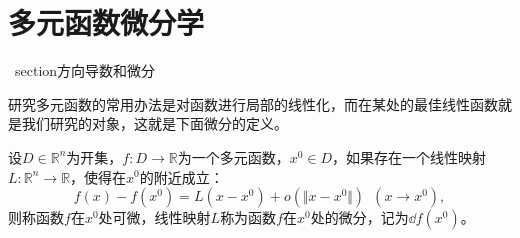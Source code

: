 \chapter{多元函数微分学}
    \   section{方向导数和微分}

    研究多元函数的常用办法是对函数进行局部的线性化，而在某处的最佳线性函数就是我们研究的对象，这就是下面微分的定义。
    \begin{definition}[微分]
        设\(D\in \mathbb{R}^n\)为开集，\enspace\(f:D\to\mathbb{R}\)为一个多元函数，\enspace\(x^0\in D\)，如果存在一个线性映射\(L:\mathbb{R}^n\to\mathbb{R}\)，使得在\(x^0\)的附近成立：\[f(x)-f(x^0) = L(x-x^0)+o(\Vert x-x^0\Vert)\enspace(x\to x^0),\]
        则称函数\(f\)在\(x^0\)处可微，线性映射\(L\)称为函数\(f\)在\(x^0\)处的微分，记为\(\dd f(x^0)\)。
    \end{definition}